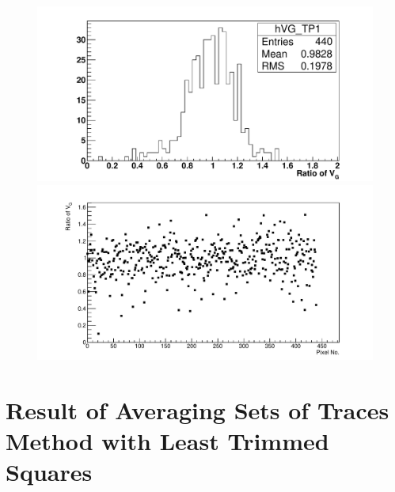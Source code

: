 \begin{figure} %
\includegraphics[width=\textwidth]{chapters/graphs/GainVarsMeas/LL_m04_2016-06-11/Set0and2/GainVairanceHist_Average_Method1.pdf}
\caption{}
\vspace{3mm}
\includegraphics[width=\textwidth]{chapters/graphs/GainVarsMeas/LL_m04_2016-06-11/Set0and2/GainVars_Vs_Pixel_GainVariance_Average_Method1_Set0and2.pdf}
\caption{}
\end{figure}

\section{Result of Averaging Sets of Traces Method with Least Trimmed Squares}

